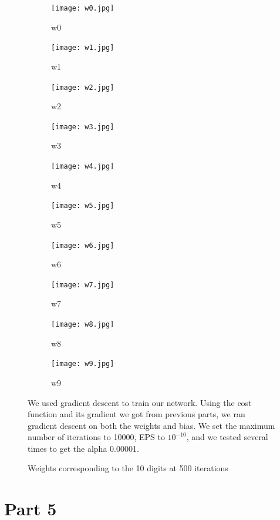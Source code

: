 \documentclass[11pt,twoside]{article}
\begin{document}
\begin{figure}[h]
	\centering
	\begin{subfigure}[h]{0.08\textwidth}
	\centering
	\texttt{[image: w0.jpg]}
	\caption*{w0}
	\end{subfigure}
	\begin{subfigure}[h]{0.08\textwidth}
	\centering
	\texttt{[image: w1.jpg]}
	\caption*{w1}
	\end{subfigure}
	\begin{subfigure}[h]{0.08\textwidth}
	\centering
	\texttt{[image: w2.jpg]}
	\caption*{w2}
	\end{subfigure}
	\begin{subfigure}[h]{0.08\textwidth}
	\centering
	\texttt{[image: w3.jpg]}
	\caption*{w3}
	\end{subfigure}
	\begin{subfigure}[h]{0.08\textwidth}
	\centering
	\texttt{[image: w4.jpg]}
	\caption*{w4}
	\end{subfigure}
	\begin{subfigure}[h]{0.08\textwidth}
	\centering
	\texttt{[image: w5.jpg]}
	\caption*{w5}
	\end{subfigure}
	\begin{subfigure}[h]{0.08\textwidth}
	\centering
	\texttt{[image: w6.jpg]}
	\caption*{w6}
	\end{subfigure}
	\begin{subfigure}[h]{0.08\textwidth}
	\centering
	\texttt{[image: w7.jpg]}
	\caption*{w7}
	\end{subfigure}
	\begin{subfigure}[h]{0.08\textwidth}
	\centering
	\texttt{[image: w8.jpg]}
	\caption*{w8}
	\end{subfigure}
	\begin{subfigure}[h]{0.08\textwidth}
	\centering
	\texttt{[image: w9.jpg]}
	\caption*{w9}
	\end{subfigure}
\caption*{Weights corresponding to the 10 digits at 500 iterations}

We used gradient descent to train our network. Using the cost function and its gradient we got from previous parts, we ran gradient descent on both the weights and bias. We set the maximum number of iterations to 10000, EPS to $10^{-10}$, and we tested several times to get the alpha 0.00001.
\end{figure}

\clearpage

\section*{Part 5}
\end{document}
